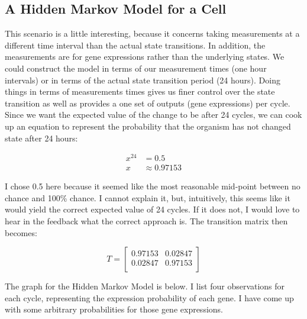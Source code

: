 \documentclass{article}
\begin{document}
\subsection{A Hidden Markov Model for a Cell}

This scenario is a little interesting, because it concerns taking measurements 
at a different time interval than the actual state transitions. In addition, the 
measurements are for gene expressions rather than the underlying states. We 
could construct the model in terms of our measurement times (one hour intervals) 
or in terms of the actual state transition period (24 hours). Doing things in 
terms of measurements times gives us finer control over the state transition as 
well as provides a one set of outputs (gene expressions) per cycle. Since we 
want the expected value of the change to be after 24 cycles, we can cook up an 
equation to represent the probability that the organism has not changed state 
after 24 hours:

\begin{align*}
x^{24} &= 0.5 \\
x &\approx 0.97153 
\end{align*}

I chose 0.5 here because it seemed like the most reasonable mid-point between no 
chance and 100\% chance. I cannot explain it, but, intuitively, this seems like 
it would yield the correct expected value of 24 cycles. If it does not, I would 
love to hear in the feedback what the correct approach is. The transition matrix 
then becomes:

$$
T = \begin{bmatrix}
0.97153 & 0.02847 \\
0.02847 & 0.97153 \\
\end{bmatrix}
$$

The graph for the Hidden Markov Model is below. I list four observations for 
each cycle, representing the expression probability of each gene. I have come up 
with some 
arbitrary probabilities for those gene expressions.
\end{document}
